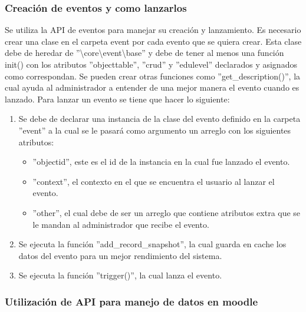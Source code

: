   \subsubsection{Creación de eventos y como lanzarlos}

			Se utiliza la API de eventos para manejar su creación y lanzamiento. Es necesario crear una clase en el carpeta event por cada evento que se quiera crear. Esta clase debe de heredar de ''\textbackslash core\textbackslash event\textbackslash base'' y debe de tener al menos una función init() con los atributos ''objecttable'', ''crud'' y ''edulevel'' declarados y asignados como correspondan.
			Se pueden crear otras funciones como ''get\_description()'', la cual ayuda al administrador a entender de una mejor manera el evento cuando es lanzado.
			Para lanzar un evento se tiene que hacer lo siguiente:

      \begin{enumerate}



				\item Se debe de declarar una instancia de la clase del evento definido en la carpeta ''event'' a la cual se le pasará como argumento un arreglo con los siguientes atributos:
        \begin{itemize}
          \item ''objectid'', este es el id de la instancia en la cual fue lanzado el evento.
          \item ''context'', el contexto en el que se encuentra el usuario al lanzar el evento.
          \item ''other'', el cual debe de ser un arreglo que contiene atributos extra que se le mandan al administrador que recibe el evento.
        \end{itemize}


				\item Se ejecuta la función ''add\_record\_snapshot'', la cual guarda en cache los datos del evento para un mejor rendimiento del sistema.
				\item Se ejecuta la función ''trigger()'', la cual lanza el evento.

      \end{enumerate}

  \subsubsection{Utilización de API para manejo de datos en moodle}


